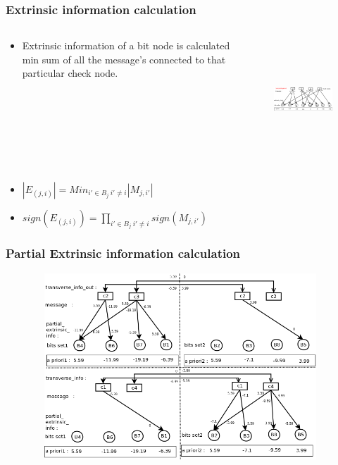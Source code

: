 \documentclass[xcolor=dvipsname]
{beamer}
\begin{document}
\begin{frame}[t]
\frametitle{ Extrinsic information calculation }  
\vspace{-5mm}
\begin{columns}[totalwidth=\textwidth]
	\begin{column}{0.3\textwidth}
	\centering
	\begin{itemize}
	\item Extrinsic information of a bit node is calculated min sum of all the message's connected to 
	that particular check node. 	
	\end{itemize}
 
			
	\end{column}%
	   		
	\begin{column}{0.7\textwidth}
	\centering
	\begin{figure}
	\includegraphics[height=4.5cm,width=8cm]{minSum4}
	\end{figure}
	\end{column}%
\end{columns}

\begin{itemize}

\item \alert{$|E_{(j,i)}| =  Min_{i'\in B_j \ i'\neq i }|M_{j,i'}|   $ }
\item \alert{$sign({E_{(j,i)}}) =  \prod_{i'\in B_j \ i'\neq i }sign(M_{j,i'})   $ }
\end{itemize}
\end{frame}

\begin{frame}[t]
\frametitle{ Partial Extrinsic information calculation }  
\vspace{-5mm}
\begin{figure}
       \includegraphics[height=7cm,width=11cm]{minSumModified3}
       \end{figure}
\end{frame}
\end{document}
